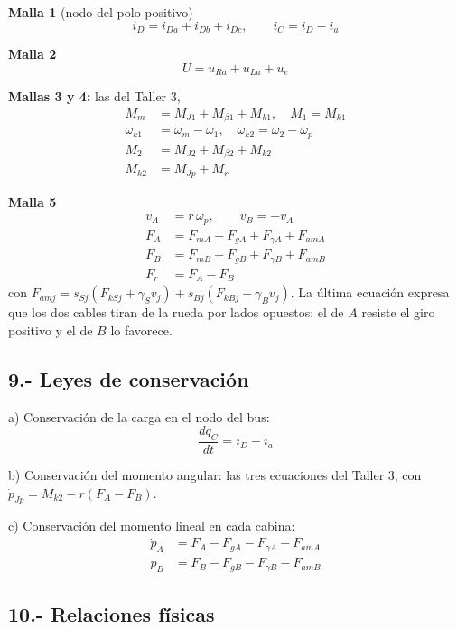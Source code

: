 \documentclass[10pt,a4paper,twocolumn]{article}
\begin{document}
\noindent\textbf{Malla 1} (nodo del polo positivo)
\[
  i_D = i_{Da} + i_{Db} + i_{Dc}, \qquad i_C = i_D - i_a
\]

\noindent\textbf{Malla 2}
\[
  U = u_{Ra} + u_{La} + u_e
\]

\noindent\textbf{Mallas 3 y 4:} las del Taller 3,
\begin{align*}
  M_m &= M_{J1} + M_{\beta1} + M_{k1}, \quad M_1 = M_{k1} \\
  \omega_{k1} &= \omega_m - \omega_1, \quad \omega_{k2} = \omega_2 - \omega_p \\
  M_2 &= M_{J2} + M_{\beta2} + M_{k2} \\
  M_{k2} &= M_{Jp} + M_r
\end{align*}

\noindent\textbf{Malla 5}
\begin{align*}
  v_A &= r\,\omega_p, \qquad v_B = -v_A \\
  F_A &= F_{mA} + F_{gA} + F_{\gamma A} + F_{amA} \\
  F_B &= F_{mB} + F_{gB} + F_{\gamma B} + F_{amB} \\
  F_r &= F_A - F_B
\end{align*}
con $F_{amj} = s_{Sj}(F_{kSj} + \gamma_S v_j) + s_{Bj}(F_{kBj} + \gamma_B v_j)$. La última
ecuación expresa que los dos cables tiran de la rueda por lados opuestos: el de $A$
resiste el giro positivo y el de $B$ lo favorece.

\subsection*{9.- Leyes de conservación}

\noindent a) Conservación de la carga en el nodo del bus:
\[
  \frac{dq_C}{dt} = i_D - i_a
\]

\noindent b) Conservación del momento angular: las tres ecuaciones del Taller 3, con
$\dot p_{Jp} = M_{k2} - r(F_A - F_B)$.

\noindent c) Conservación del momento lineal en cada cabina:
\begin{align*}
  \dot p_A &= F_A - F_{gA} - F_{\gamma A} - F_{amA} \\
  \dot p_B &= F_B - F_{gB} - F_{\gamma B} - F_{amB}
\end{align*}

\subsection*{10.- Relaciones físicas}
\end{document}

